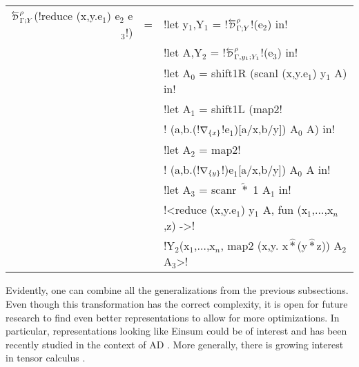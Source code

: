 \begin{center}
\begin{tabular}{r c l}
    $\directD{\rho}{\Gamma}{Y}$(!reduce (x,y.e$_{1}$) e$_{2}$ e$_{3}$!) &=&
    !let y$_{1}$,Y$_{1}$ = !$\directD{\rho}{\Gamma}{Y}$!(e$_{2}$) in! \\
    && !let A,Y$_{2}$ = !$\directD{\rho}{\Gamma,y_1}{Y_1}$!(e$_{3}$) in! \\
    && !let A$_{0}$ = shift1R (scanl (x,y.e$_{1}$) y$_{1}$ A) in! \\
    && !let A$_{1}$ = shift1L (map2! \\ 
    && !      (a,b.(!$\nabla_{\{x\}}$!e$_{1}$)[a/x,b/y]) A$_{0}$ A) in! \\
    && !let A$_{2}$ = map2! \\
    && !      (a,b.(!$\nabla_{\{y\}}$!)e$_{1}$[a/x,b/y]) A$_{0}$ A in! \\
    && !let A$_{3}$ = scanr $\widetilde{*}$ 1 A$_{1}$ in! \\
    && !<reduce (x,y.e$_{1}$) y$_{1}$ A, fun (x$_{1}$,$\ldots$,x$_n$,z) ->! \\
    && !Y$_{2}$(x$_{1}$,$\ldots$,x$_n$, map2 (x,y. x$\widehat{*}$(y$\widehat{*}$z)) A$_{2}$ A$_{3}$>! \\
\end{tabular}
\end{center}

Evidently, one can combine all the generalizations from the previous subsections.
Even though this transformation has the correct complexity, it is open for future research to find
even better representations to allow for more optimizations. 
In particular, representations looking like Einsum \cite{van2011numpy} could be of interest 
and has been recently studied in the context of AD \cite{laue2018computing,laue2020simple}.
More generally, there is growing interest in tensor calculus \cite{liao2019differentiable,bernstein2020differentiating}.

